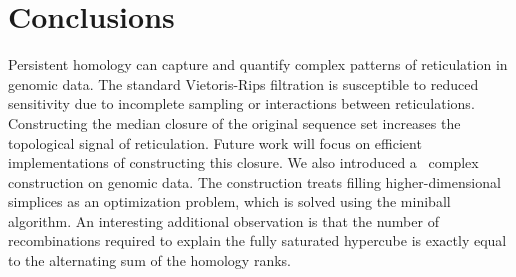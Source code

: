 


\section{Conclusions}
\label{complex_construction:conclusion}

Persistent homology can capture and quantify complex patterns of reticulation in genomic data.
The standard Vietoris-Rips filtration is susceptible to reduced sensitivity due to incomplete sampling or interactions between reticulations.
Constructing the median closure of the original sequence set increases the topological signal of reticulation.
Future work will focus on efficient implementations of constructing this closure.
We also introduced a \Cech\ complex construction on genomic data.
The construction treats filling higher-dimensional simplices as an optimization problem, which is solved using the miniball algorithm.
An interesting additional observation is that the number of recombinations required to explain the fully saturated hypercube is exactly equal to the alternating sum of the homology ranks.